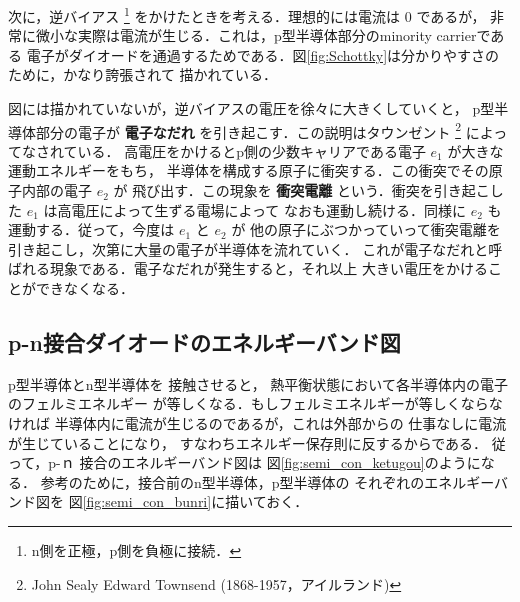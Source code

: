         次に，逆バイアス
            \footnote{
                n側を正極，p側を負極に接続．
            }
        をかけたときを考える．理想的には電流は $0$ であるが，
        非常に微小な実際は電流が生じる．これは，p型半導体部分のminority carrierである
        電子がダイオードを通過するためである．図\ref{fig:Schottky}は分かりやすさのために，かなり誇張されて
        描かれている．

        図には描かれていないが，逆バイアスの電圧を徐々に大きくしていくと，
        p型半導体部分の電子が {\bf 電子なだれ} を引き起こす．この説明はタウンゼント
            \footnote{
                John Sealy Edward Townsend (1868-1957，アイルランド)
            }
        によってなされている．
        高電圧をかけるとp側の少数キャリアである電子 $e_{1}$ が大きな運動エネルギーをもち，
        半導体を構成する原子に衝突する．この衝突でその原子内部の電子 $e_{2}$ が
        飛び出す．この現象を {\bf 衝突電離} という．衝突を引き起こした $e_{1}$ は高電圧によって生ずる電場によって
        なおも運動し続ける．同様に $e_{2}$ も運動する．従って，今度は $e_{1}$ と $e_{2}$ が
        他の原子にぶつかっていって衝突電離を引き起こし，次第に大量の電子が半導体を流れていく．
        これが電子なだれと呼ばれる現象である．電子なだれが発生すると，それ以上
        大きい電圧をかけることができなくなる．

        \subsection{p-n接合ダイオードのエネルギーバンド図}
        p型半導体とn型半導体を
        接触させると，
        熱平衡状態において各半導体内の電子のフェルミエネルギー
        が等しくなる．もしフェルミエネルギーが等しくならなければ
        半導体内に電流が生じるのであるが，これは外部からの
        仕事なしに電流が生じていることになり，
        すなわちエネルギー保存則に反するからである．
        従って，p-ｎ 接合のエネルギーバンド図は
        図\ref{fig:semi_con_ketugou}のようになる．
        参考のために，接合前のn型半導体，p型半導体の
        それぞれのエネルギーバンド図を
        図\ref{fig:semi_con_bunri}に描いておく．

